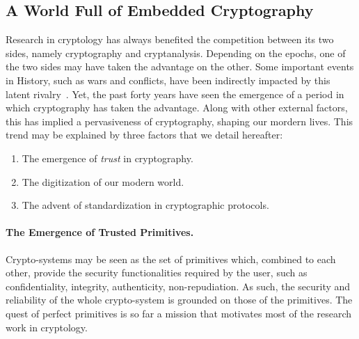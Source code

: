 \subsection{A World Full of Embedded Cryptography}
\label{sec:world_crypto}

Research in \gls{cryptology} has always benefited the competition between its two sides, namely \gls{cryptography} and \gls{cryptanalysis}.
Depending on the epochs, one of the two sides may have taken the advantage on the other.
Some important events in History, such as wars and conflicts, have been indirectly impacted by this latent rivalry~\cite{singh_code_book_1999}.
Yet, the past forty years have seen the emergence of a period in which \gls{cryptography} has taken the advantage.
Along with other external factors, this has implied a pervasiveness of \gls{cryptography}, shaping our mordern lives.
This trend may be explained by three factors that we detail hereafter:
\begin{enumerate}
	\item The emergence of \emph{trust} in \gls{cryptography}.
	\item The digitization of our modern world.
	\item The advent of standardization in cryptographic protocols.
\end{enumerate}


\paragraph{The Emergence of Trusted Primitives.}
Crypto-systems may be seen as the set of \glspl{primitive} which, combined to each other, provide the security functionalities required by the user, such as confidentiality, integrity, authenticity, non-repudiation.
As such, the security and reliability of the whole crypto-system is grounded on those of the primitives.
The quest of perfect primitives is so far a mission that motivates most of the research work in \gls{cryptology}.

